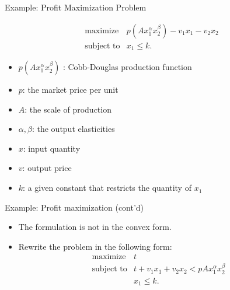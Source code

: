 \documentclass[10pt,ignorenonframetext,serif,onlymath]{beamer}
\providecommand{\tightlist}{%
  \setlength{\itemsep}{0pt}\setlength{\parskip}{0pt}}
\begin{document}
\begin{frame}{Example: Profit Maximization Problem}
\protect\hypertarget{sec:example-profit-maximization-problem}{}

\[\begin{array}{ll}
   \text{maximize} & p(A x_1^\alpha x_2^\beta) - v_1 x_1 - v_2 x_2 \\
   \text{subject to}& x_1 \le k.
\end{array}\]

\begin{itemize}
\tightlist
\item
  \(p(A x_1^\alpha x_2^\beta)\) : Cobb-Douglas production function
\item
  \(p\): the market price per unit
\item
  \(A\): the scale of production
\item
  \(\alpha, \beta\): the output elasticities
\item
  \(x\): input quantity
\item
  \(v\): output price
\item
  \(k\): a given constant that restricts the quantity of \(x_1\)
\end{itemize}

\end{frame}

\begin{frame}{Example: Profit maximization (cont’d)}
\protect\hypertarget{sec:example-profit-maximization-contd}{}

\begin{itemize}
\tightlist
\item
  The formulation is not in the convex form.
\item
  Rewrite the problem in the following form: \[\begin{array}{ll}
    \text{maximize} & t \\
    \text{subject to} & t  + v_1 x_1  + v_2 x_2 < p A x_1^{\alpha} x_2^{\beta}\\
                  & x_1 \le k.
    \end{array}\]
\end{itemize}

\end{frame}
\end{document}
